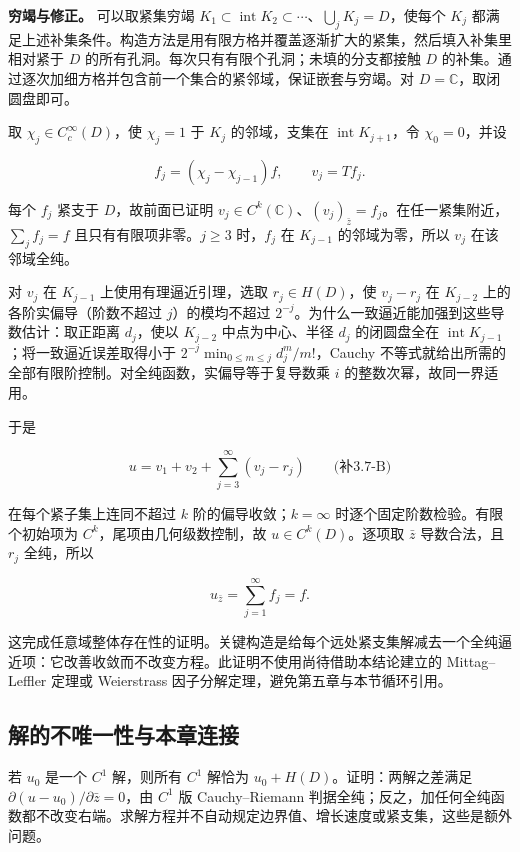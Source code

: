 \documentclass[11pt,a4paper]{article}
\begin{document}
\textbf{穷竭与修正。} 可以取紧集穷竭
\(K_1\subset\operatorname{int}K_2\subset\cdots\)、\(\bigcup_jK_j=D\)，使每个
\(K_j\)
都满足上述补集条件。构造方法是用有限方格并覆盖逐渐扩大的紧集，然后填入补集里相对紧于
\(D\) 的所有孔洞。每次只有有限个孔洞；未填的分支都接触 \(D\)
的补集。通过逐次加细方格并包含前一个集合的紧邻域，保证嵌套与穷竭。对
\(D=\mathbb C\)，取闭圆盘即可。

取 \(\chi_j\in C_c^\infty(D)\)，使 \(\chi_j=1\) 于 \(K_j\)
的邻域，支集在 \(\operatorname{int}K_{j+1}\)，令 \(\chi_0=0\)，并设

\[
f_j=(\chi_j-\chi_{j-1})f,
\qquad v_j=T f_j.
\]

每个 \(f_j\) 紧支于 \(D\)，故前面已证明
\(v_j\in C^k(\mathbb C)\)、\((v_j)_{\bar z}=f_j\)。在任一紧集附近，\(\sum_j f_j=f\)
且只有有限项非零。\(j\ge3\) 时，\(f_j\) 在 \(K_{j-1}\) 的邻域为零，所以
\(v_j\) 在该邻域全纯。

对 \(v_j\) 在 \(K_{j-1}\) 上使用有理逼近引理，选取 \(r_j\in H(D)\)，使
\(v_j-r_j\) 在 \(K_{j-2}\) 上的各阶实偏导（阶数不超过
\(j\)）的模均不超过
\(2^{-j}\)。为什么一致逼近能加强到这些导数估计：取正距离 \(d_j\)，使以
\(K_{j-2}\) 中点为中心、半径 \(d_j\) 的闭圆盘全在
\(\operatorname{int}K_{j-1}\)；将一致逼近误差取得小于
\(2^{-j}\min_{0\le m\le j}d_j^m/m!\)，Cauchy
不等式就给出所需的全部有限阶控制。对全纯函数，实偏导等于复导数乘 \(i\)
的整数次幂，故同一界适用。

于是

\[
u=v_1+v_2+\sum_{j=3}^{\infty}(v_j-r_j)
\qquad\text{(补3.7-B)}
\]

在每个紧子集上连同不超过 \(k\) 阶的偏导收敛；\(k=\infty\)
时逐个固定阶数检验。有限个初始项为 \(C^k\)，尾项由几何级数控制，故
\(u\in C^k(D)\)。逐项取 \(\bar z\) 导数合法，且 \(r_j\) 全纯，所以

\[
u_{\bar z}=\sum_{j=1}^{\infty}f_j=f.
\]

这完成任意域整体存在性的证明。关键构造是给每个远处紧支集解减去一个全纯逼近项：它改善收敛而不改变方程。此证明不使用尚待借助本结论建立的
Mittag--Leffler 定理或 Weierstrass
因子分解定理，避免第五章与本节循环引用。

\subsection{解的不唯一性与本章连接}\label{ch03-s7-ux89e3ux7684ux4e0dux552fux4e00ux6027ux4e0eux672cux7ae0ux8fdeux63a5}

若 \(u_0\) 是一个 \(C^1\) 解，则所有 \(C^1\) 解恰为
\(u_0+H(D)\)。证明：两解之差满足
\(\partial(u-u_0)/\partial\bar z=0\)，由 \(C^1\) 版 Cauchy--Riemann
判据全纯；反之，加任何全纯函数都不改变右端。求解方程并不自动规定边界值、增长速度或紧支集，这些是额外问题。
\end{document}

